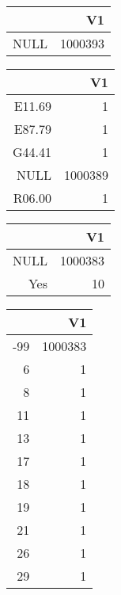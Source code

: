 \bigskip\bigskip
\centering
\begin{tabular}{rr}
  \hline
 & V1 \\ 
  \hline
NULL & 1000393 \\ 
   \hline
\end{tabular}

\bigskip\bigskip
\centering
\begin{tabular}{rr}
  \hline
 & V1 \\ 
  \hline
E11.69 &   1 \\ 
  E87.79 &   1 \\ 
  G44.41 &   1 \\ 
  NULL & 1000389 \\ 
  R06.00 &   1 \\ 
   \hline
\end{tabular}

\bigskip\bigskip
\centering
\begin{tabular}{rr}
  \hline
 & V1 \\ 
  \hline
NULL & 1000383 \\ 
  Yes &  10 \\ 
   \hline
\end{tabular}

\bigskip\bigskip
\centering
\begin{tabular}{rr}
  \hline
 & V1 \\ 
  \hline
-99 & 1000383 \\ 
  6 &   1 \\ 
  8 &   1 \\ 
  11 &   1 \\ 
  13 &   1 \\ 
  17 &   1 \\ 
  18 &   1 \\ 
  19 &   1 \\ 
  21 &   1 \\ 
  26 &   1 \\ 
  29 &   1 \\ 
   \hline
\end{tabular}

